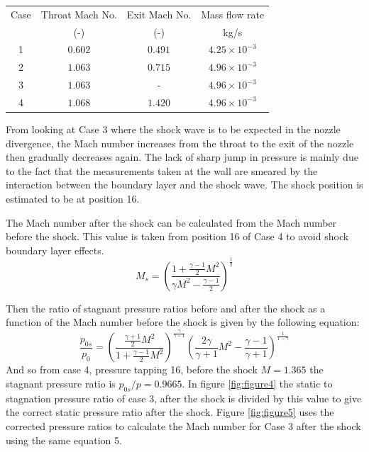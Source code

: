 \documentclass[8pt]{article}
\begin{document}
\begin{center}
    \begin{tabular}{|c|c|c|c|}
    \hline 
    Case & Throat Mach No.  & Exit Mach No. & Mass flow rate\\
     & (-) & (-) & kg/s \\
    \hline 
    1 & $0.602$ & $0.491$ & $ 4.25 \times 10^{-3} $ \\
    2 & $1.063$ & $0.715$ & $ 4.96 \times 10^{-3} $ \\
    3 & $1.063$ & - & $ 4.96 \times 10^{-3} $ \\
    4 & $1.068$ & $1.420$ & $ 4.96 \times 10^{-3} $ \\
    \hline
    \end{tabular}
    \label{tab:1}
\end{center}

From looking at Case 3 where the shock wave is to be expected in the nozzle divergence, the Mach number increases from the throat to the exit of the nozzle then gradually decreases again.
The lack of sharp jump in pressure is mainly due to the fact that the measurements taken at the wall are smeared by the interaction between the boundary layer and the shock wave.
The shock position is estimated to be at position 16.

The Mach number after the shock can be calculated from the Mach number before the shock. This value is taken from position 16 of Case 4 to avoid shock boundary layer effects.
\begin{equation}
    M_s = \left( \frac{1 + \frac{\gamma - 1}{2} M^2}{\gamma M^2 - \frac{\gamma - 1}{2}} \right) ^ \frac{1}{2}
\end{equation}

Then the ratio of stagnant pressure ratios before and after the shock as a function of the Mach number before the shock is given by the following equation:
\begin{equation}
    \frac{p_{0s}}{p_0} = \left( \frac{\frac{\gamma+1}{2}M^2}{1 + \frac{\gamma-1}{2}M^2}\right) ^ \frac{\gamma}{\gamma-1} \left( \frac{2\gamma}{\gamma+1} M^2 - \frac{\gamma-1}{\gamma+1}\right) ^ \frac{1}{1 - \gamma}
\end{equation}
And so from case 4, pressure tapping 16, before the shock $M = 1.365$ the stagnant pressure ratio is $p_{0s}/p = 0.9665$.
In figure \ref{fig:figure4} the static to stagnation pressure ratio of case 3, after the shock is divided by this value to give the correct static pressure ratio after the shock.
Figure \ref{fig:figure5} uses the corrected pressure ratios to calculate the Mach number for Case 3 after the shock using the same equation 5.
\end{document}
